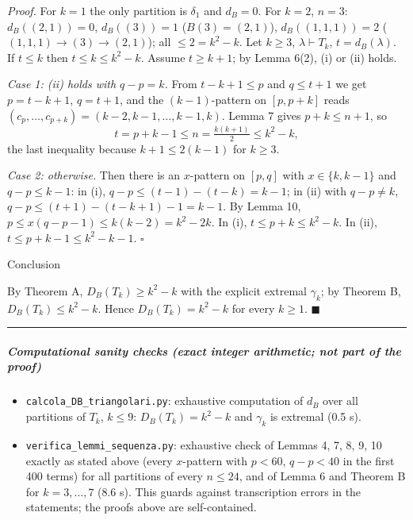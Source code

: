 \documentclass[11pt,a4paper]{article}
\providecommand{\tightlist}{\setlength{\itemsep}{0pt}\setlength{\parskip}{0pt}}
\begin{document}
\emph{Proof.} For \(k=1\) the only partition is \(\delta_1\) and
\(d_B=0\). For \(k=2\), \(n=3\): \(d_B((2,1))=0\), \(d_B((3))=1\)
(\(B(3)=(2,1)\)), \(d_B((1,1,1))=2\) (\((1,1,1)\to(3)\to(2,1)\)); all
\(\le2=k^2-k\). Let \(k\ge3\), \(\lambda\vdash T_k\),
\(t=d_B(\lambda)\). If \(t\le k\) then \(t\le k\le k^2-k\). Assume
\(t\ge k+1\); by Lemma 6(2), (i) or (ii) holds.

\emph{Case 1: (ii) holds with \(q-p=k\).} From \(t-k+1\le p\) and
\(q\le t+1\) we get \(p=t-k+1\), \(q=t+1\), and the \((k-1)\)-pattern on
\([p,p+k]\) reads \((c_p,\dots,c_{p+k})=(k-2,k-1,\dots,k-1,k)\). Lemma 7
gives \(p+k\le n+1\), so \[t=p+k-1\le n=\tfrac{k(k+1)}2\le k^2-k,\] the
last inequality because \(k+1\le 2(k-1)\) for \(k\ge3\).

\emph{Case 2: otherwise.} Then there is an \(x\)-pattern on \([p,q]\)
with \(x\in\{k,k-1\}\) and \(q-p\le k-1\): in (i),
\(q-p\le (t-1)-(t-k)=k-1\); in (ii) with \(q-p\ne k\),
\(q-p\le (t+1)-(t-k+1)-1=k-1\). By Lemma 10,
\(p\le x(q-p-1)\le k(k-2)=k^2-2k\). In (i), \(t\le p+k\le k^2-k\). In
(ii), \(t\le p+k-1\le k^2-k-1\). \(\square\)

Conclusion

By Theorem A, \(D_B(T_k)\ge k^2-k\) with the explicit extremal
\(\gamma_k\); by Theorem B, \(D_B(T_k)\le k^2-k\). Hence
\(D_B(T_k)=k^2-k\) for every \(k\ge1\). \(\blacksquare\)

\begin{center}\rule{0.5\linewidth}{0.5pt}\end{center}

\subparagraph{Computational sanity checks (exact integer arithmetic; not
part of the
proof)}\label{computational-sanity-checks-exact-integer-arithmetic-not-part-of-the-proof}

\begin{itemize}
\tightlist
\item
  \texttt{calcola\_DB\_triangolari.py}: exhaustive computation of
  \(d_B\) over all partitions of \(T_k\), \(k\le 9\): \(D_B(T_k)=k^2-k\)
  and \(\gamma_k\) is extremal (0.5 s).
\item
  \texttt{verifica\_lemmi\_sequenza.py}: exhaustive check of Lemmas 4,
  7, 8, 9, 10 exactly as stated above (every \(x\)-pattern with
  \(p<60\), \(q-p<40\) in the first 400 terms) for all partitions of
  every \(n\le24\), and of Lemma 6 and Theorem B for \(k=3,\dots,7\)
  (8.6 s). This guards against transcription errors in the statements;
  the proofs above are self-contained.
\end{itemize}
\end{document}

